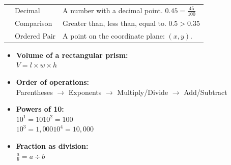 {\begin{center}
\begin{tabular}{
    >{\centering\arraybackslash}m{2cm}
    >{\raggedright\arraybackslash}m{3cm}
    >{\raggedright\arraybackslash}m{8.5cm}
}
{\fontsize{20}{22}\selectfont\textcolor{funPink}{$0.45$}} &
Decimal &
A number with a decimal point. \hfill $0.45 = \frac{45}{100}$ \\

{\fontsize{20}{22}\selectfont\textcolor{funTeal}{$>$\;$<$\;$=$}} &
Comparison &
Greater than, less than, equal to. \hfill $0.5 > 0.35$ \\

{\fontsize{20}{22}\selectfont\textcolor{funRed}{$(3,\!5)$}} &
Ordered Pair &
A point on the coordinate plane: $(x, y)$. \\

\bottomrule
\end{tabular}
\end{center}

\vspace{2mm}

\begin{tcolorbox}[
    enhanced,
    colback=funGreenLight,
    colframe=funGreen!50,
    arc=8pt, boxrule=1pt,
    left=5mm, right=5mm, top=3mm, bottom=3mm,
    title={\textcolor{white}{\faCalculator~Key Formulas}},
    colbacktitle=funGreen!70,
    fonttitle=\bfseries\sffamily,
]
    \small
    \begin{multicols}{2}
    \begin{itemize}[leftmargin=*, itemsep=3pt]
        \item \textbf{Volume of a rectangular prism:}\\
            $V = l \times w \times h$
        \item \textbf{Order of operations:}\\
            Parentheses $\to$ Exponents $\to$
            Multiply/Divide $\to$ Add/Subtract
        \item \textbf{Powers of 10:}\\
            $10^{1} = 10$\quad $10^{2} = 100$\\
            $10^{3} = 1{,}000$\quad $10^{4} = 10{,}000$
        \item \textbf{Fraction as division:}\\
            $\frac{a}{b} = a \div b$
    \end{itemize}
    \end{multicols}
\end{tcolorbox}

\vspace{2mm}

}
